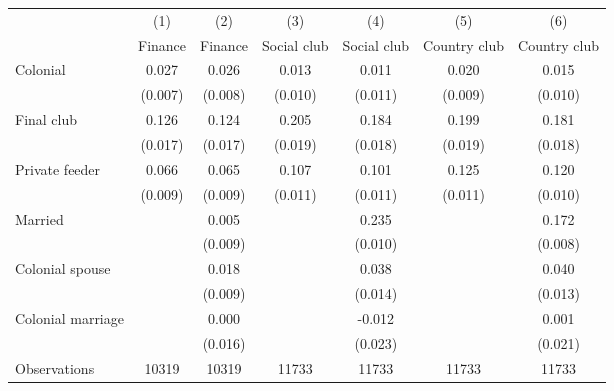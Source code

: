 \begin{tabular}{l*{6}{c}}
\toprule
                    &\multicolumn{1}{c}{(1)}&\multicolumn{1}{c}{(2)}&\multicolumn{1}{c}{(3)}&\multicolumn{1}{c}{(4)}&\multicolumn{1}{c}{(5)}&\multicolumn{1}{c}{(6)}\\
                    &\multicolumn{1}{c}{Finance}&\multicolumn{1}{c}{Finance}&\multicolumn{1}{c}{Social club}&\multicolumn{1}{c}{Social club}&\multicolumn{1}{c}{Country club}&\multicolumn{1}{c}{Country club}\\
\midrule
Colonial            &       0.027&       0.026&       0.013&       0.011&       0.020&       0.015\\
                    &     (0.007)&     (0.008)&     (0.010)&     (0.011)&     (0.009)&     (0.010)\\
\addlinespace
Final club          &       0.126&       0.124&       0.205&       0.184&       0.199&       0.181\\
                    &     (0.017)&     (0.017)&     (0.019)&     (0.018)&     (0.019)&     (0.018)\\
\addlinespace
Private feeder      &       0.066&       0.065&       0.107&       0.101&       0.125&       0.120\\
                    &     (0.009)&     (0.009)&     (0.011)&     (0.011)&     (0.011)&     (0.010)\\
\addlinespace
Married             &            &       0.005&            &       0.235&            &       0.172\\
                    &            &     (0.009)&            &     (0.010)&            &     (0.008)\\
\addlinespace
Colonial spouse     &            &       0.018&            &       0.038&            &       0.040\\
                    &            &     (0.009)&            &     (0.014)&            &     (0.013)\\
\addlinespace
Colonial marriage   &            &       0.000&            &      -0.012&            &       0.001\\
                    &            &     (0.016)&            &     (0.023)&            &     (0.021)\\
\midrule
Observations        &       10319&       10319&       11733&       11733&       11733&       11733\\
\bottomrule
\end{tabular}
